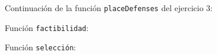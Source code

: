 %
%
Continuación de la función \texttt{placeDefenses} del ejercicio 3:

Función \texttt{factibilidad}:

Función \texttt{selección}:

